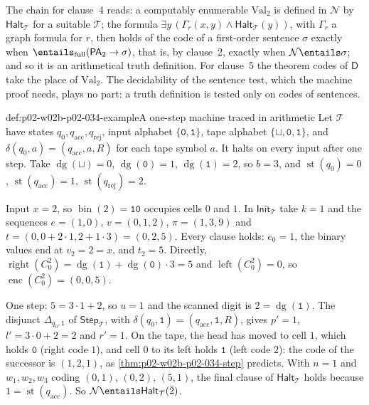 The chain for clause~4 reads: a computably enumerable \(\mathrm{Val}_2\) is
defined in \(\mathcal N\) by \(\mathsf{Halt}_{\mathcal T}\) for a suitable
\(\mathcal T\); the formula
\(\exists y\,(\Gamma_r(x,y)\land\mathsf{Halt}_{\mathcal T}(y))\), with
\(\Gamma_r\) a graph formula for \(r\), then holds of the code of a
first-order sentence \(\sigma\) exactly when
\(\entails_{\mathrm{full}}(\mathsf{PA}_2\to\sigma)\), that is, by clause~2,
exactly when \(\mathcal N\entails\sigma\); and so it is an arithmetical truth
definition.  For clause~5 the theorem codes of \(\mathsf D\) take the place
of \(\mathrm{Val}_2\).  The decidability of the sentence test, which the
machine proof needs, plays no part: a truth definition is tested only on
codes of sentences.

\begin{hbexample}{def:p02-w02b-p02-034-example}{A one-step machine traced in arithmetic}
Let \(\mathcal T\) have states \(q_0,q_{\mathrm{acc}},q_{\mathrm{rej}}\), input
alphabet \(\{\mathtt 0,\mathtt 1\}\), tape alphabet
\(\{\sqcup,\mathtt 0,\mathtt 1\}\), and \(\delta(q_0,a)=(q_{\mathrm{acc}},a,R)\)
for each tape symbol \(a\).  It halts on every input after one step.  Take
\(\operatorname{dg}(\sqcup)=0\), \(\operatorname{dg}(\mathtt 0)=1\),
\(\operatorname{dg}(\mathtt 1)=2\), so \(b=3\), and
\(\operatorname{st}(q_0)=0\), \(\operatorname{st}(q_{\mathrm{acc}})=1\),
\(\operatorname{st}(q_{\mathrm{rej}})=2\).

Input \(x=2\), so \(\operatorname{bin}(2)=\mathtt{10}\) occupies cells \(0\)
and \(1\).  In \(\mathsf{Init}_{\mathcal T}\) take \(k=1\) and the sequences
\(e=(1,0)\), \(v=(0,1,2)\), \(\pi=(1,3,9)\) and
\(t=(0,0+2\cdot1,2+1\cdot3)=(0,2,5)\).  Every clause holds: \(e_0=1\), the
binary values end at \(v_2=2=x\), and \(t_2=5\).  Directly,
\(\operatorname{right}(C^2_0)=\operatorname{dg}(\mathtt 1)+\operatorname{dg}(\mathtt 0)\cdot3=5\)
and \(\operatorname{left}(C^2_0)=0\), so \(\operatorname{enc}(C^2_0)=(0,0,5)\).

One step: \(5=3\cdot1+2\), so \(u=1\) and the scanned digit is
\(2=\operatorname{dg}(\mathtt 1)\).  The disjunct \(\Delta_{q_0,\mathtt 1}\) of
\(\mathsf{Step}_{\mathcal T}\), with \(\delta(q_0,\mathtt 1)=(q_{\mathrm{acc}},\mathtt 1,R)\),
gives \(p'=1\), \(l'=3\cdot0+2=2\) and \(r'=1\).  On the tape, the head has
moved to cell \(1\), which holds \(\mathtt 0\) (right code \(1\)), and cell \(0\)
to its left holds \(\mathtt 1\) (left code \(2\)): the code of the successor is
\((1,2,1)\), as \cref{thm:p02-w02b-p02-034-step} predicts.  With \(n=1\) and
\(w_1,w_2,w_3\) coding \((0,1)\), \((0,2)\), \((5,1)\), the final clause of
\(\mathsf{Halt}_{\mathcal T}\) holds because \(1=\operatorname{st}(q_{\mathrm{acc}})\).
So \(\mathcal N\entails\mathsf{Halt}_{\mathcal T}(\bar2)\).
\end{hbexample}

